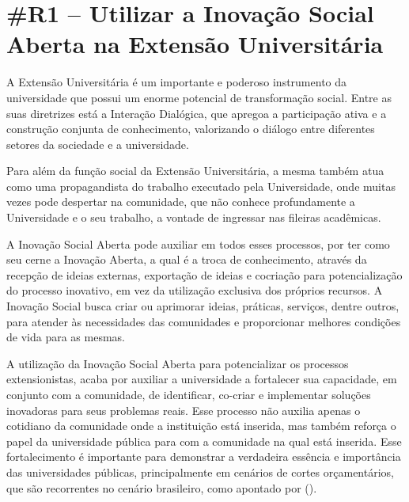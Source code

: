 \section*{\#R1 – Utilizar a Inovação Social Aberta na Extensão Universitária}

A Extensão Universitária é um importante e poderoso instrumento da universidade que possui um enorme potencial de transformação social. Entre as suas diretrizes está a Interação Dialógica, que apregoa a participação ativa e a construção conjunta de conhecimento, valorizando o diálogo entre diferentes setores da sociedade e a universidade.

Para além da função social da Extensão Universitária, a mesma também atua como uma propagandista do trabalho executado pela Universidade, onde muitas vezes pode despertar na comunidade, que não conhece profundamente a Universidade e o seu trabalho, a vontade de ingressar nas fileiras acadêmicas.

A Inovação Social Aberta pode auxiliar em todos esses processos, por ter como seu cerne a Inovação Aberta, a qual é a troca de conhecimento, através da recepção de ideias externas, exportação de ideias e cocriação para potencialização do processo inovativo, em vez da utilização exclusiva dos próprios recursos. A Inovação Social busca criar ou aprimorar ideias, práticas, serviços, dentre outros, para atender às necessidades das comunidades e proporcionar melhores condições de vida para as mesmas.

A utilização da Inovação Social Aberta para potencializar os processos extensionistas, acaba por auxiliar a universidade a fortalecer sua capacidade, em conjunto com a comunidade, de identificar, co-criar e implementar soluções inovadoras para seus problemas reais. Esse processo não auxilia apenas o cotidiano da comunidade onde a instituição está inserida, mas também reforça o papel da universidade pública para com a comunidade na qual está inserida. Esse fortalecimento é importante para demonstrar a verdadeira essência e importância das universidades públicas, principalmente em cenários de cortes orçamentários, que são recorrentes no cenário brasileiro, como apontado por \citeauthor{spannenberg2023} (\citeyear{spannenberg2023}).